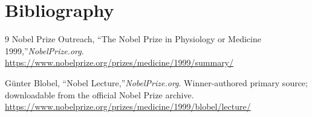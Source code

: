 \section{Bibliography}

\begin{thebibliography}{9}
Nobel Prize Outreach, ``The Nobel Prize in Physiology or Medicine 1999,''\emph{NobelPrize.org}.\\
\url{https://www.nobelprize.org/prizes/medicine/1999/summary/}

G\"unter Blobel, ``Nobel Lecture,''\emph{NobelPrize.org}. Winner-authored primary source; downloadable from the official Nobel Prize archive.\\
\url{https://www.nobelprize.org/prizes/medicine/1999/blobel/lecture/}
\end{thebibliography}
